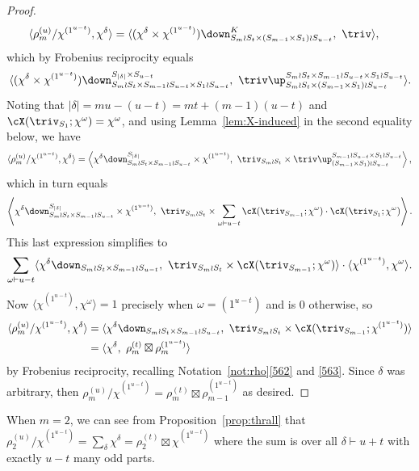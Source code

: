 \begin{proof}
	\begin{align*}
		\langle \rho^{(u)}_m/\chi^{(1^{u-t})}, \chi^\delta\rangle &= \langle (\chi^\delta\times\chi^{(1^{u-t})})\down^K_{S_m\wr S_t\times (S_{m-1}\times S_1)\wr S_{u-t}},\ \triv\rangle,
		\end{align*}
which by Frobenius reciprocity equals
		\[\langle (\chi^\delta\times\chi^{(1^{u-t})})\down^{S_{|\delta|}\times S_{u-t}}_{S_m\wr S_t\times S_{m-1}\wr S_{u-t}\times S_1\wr S_{u-t}},\ \triv\up_{S_m\wr S_t\times (S_{m-1}\times S_1)\wr S_{u-t}}^{{S_m\wr S_t\times S_{m-1}\wr S_{u-t}\times S_1\wr S_{u-t}}}\rangle.
	\]
		 Noting that $|\delta|=mu-(u-t)=mt+(m-1)(u-t)$ and $\cX(\triv_{S_1};\chi^\omega)=\chi^\omega$, and using Lemma~\ref{lem:X-induced} in the second equality below, we have
	\begin{align*}
		\langle \rho^{(u)}_m/\chi^{(1^{u-t})}, \chi^\delta\rangle = \left\langle \chi^\delta\down^{S_{|\delta|}}_{S_m\wr S_t\times S_{m-1}\wr S_{u-t}} \times \chi^{(1^{u-t})},\ \triv_{S_m\wr S_t} \times \triv\up_{(S_{m-1}\times S_1)\wr S_{u-t}}^{S_{m-1}\wr S_{u-t}\times S_1\wr S_{u-t}}\right\rangle,
		\end{align*}
which in turn equals
\[
 \left\langle \chi^\delta\down^{S_{|\delta|}}_{S_m\wr S_t\times S_{m-1}\wr S_{u-t}} \times \chi^{(1^{u-t})},\ \triv_{S_m\wr S_t} \times \sum_{\omega\vdash u-t}\cX(\triv_{S_{m-1}}; \chi^\omega)\cdot\cX(\triv_{S_1};\chi^\omega) \right\rangle.
 \]
 This last expression simplifies to
\[
 \sum_{\omega\vdash u-t} \langle \chi^\delta\down_{S_m\wr S_t\times S_{m-1}\wr S_{u-t}},\ \triv_{S_m\wr S_t}\times \cX(\triv_{S_{m-1}};\chi^\omega)\rangle\cdot\langle \chi^{(1^{u-t})},\chi^\omega\rangle.
 \]
Now $\langle \chi^{(1^{u-t})},\chi^\omega\rangle=1$ precisely when $\omega=(1^{u-t})$ and is 0 otherwise, so
	\begin{align*} \langle \rho^{(u)}_m/\chi^{(1^{u-t})}, \chi^\delta\rangle &= \langle \chi^\delta\down_{S_m\wr S_t\times S_{m-1}\wr S_{u-t}},\ \triv_{S_m\wr S_t}\times \cX(\triv_{S_{m-1}};\chi^{(1^{u-t})})\rangle\\ &= \langle \chi^\delta,\ \rho^{(t)}_m\boxtimes \rho^{(1^{u-t})}_m\rangle \end{align*}
	by Frobenius reciprocity, recalling Notation~\ref{not:rho}\ref{562} and \ref{563}.
	Since $\delta$ was arbitrary, then $\rho^{(u)}_m/\chi^{(1^{u-t})} = \rho^{(t)}_m\boxtimes \rho^{(1^{u-t})}_{m-1}$ as desired.
\end{proof}

\begin{remark}
	When $m=2$, we can see from Proposition~\ref{prop:thrall} that $\rho^{(u)}_2/\chi^{(1^{u-t})} = \sum_\delta \chi^\delta = \rho^{(t)}_2\boxtimes\chi^{(1^{u-t})}$ where the sum is over all $\delta\vdash u+t$ with exactly $u-t$ many odd parts.%
\end{remark}

